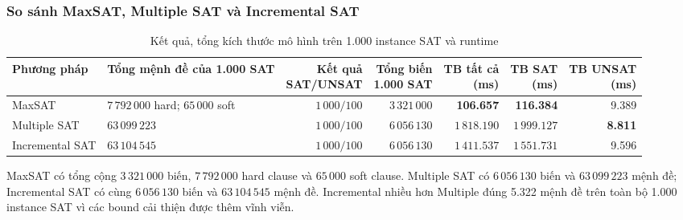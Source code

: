 \documentclass[a4paper,fleqn]{cas-sc}
\begin{document}
\subsubsection{So sánh MaxSAT, Multiple SAT và Incremental SAT}

\begin{table}[htbp]
\centering
\caption{Kết quả, tổng kích thước mô hình trên 1.000 instance SAT và runtime}
\label{tab:method-results}
\scriptsize
\begin{tabularx}{\linewidth}{@{}lXrrrrr@{}}
\toprule
Phương pháp & Tổng mệnh đề của 1.000 SAT & \shortstack{Kết quả\\SAT/UNSAT} & \shortstack{Tổng biến\\1.000 SAT} & \shortstack{TB tất cả\\(ms)} & \shortstack{TB SAT\\(ms)} & \shortstack{TB UNSAT\\(ms)}\\
\midrule
MaxSAT & $7\,792\,000$ hard; $65\,000$ soft & $1\,000/100$ & $3\,321\,000$ & \textbf{106.657} & \textbf{116.384} & 9.389\\
Multiple SAT & $63\,099\,223$ & $1\,000/100$ & $6\,056\,130$ & $1\,818.190$ & $1\,999.127$ & \textbf{8.811}\\
Incremental SAT & $63\,104\,545$ & $1\,000/100$ & $6\,056\,130$ & $1\,411.537$ & $1\,551.731$ & 9.596\\
\bottomrule
\end{tabularx}
\end{table}

 MaxSAT có tổng cộng $3\,321\,000$ biến, $7\,792\,000$ hard clause và $65\,000$ soft clause. Multiple SAT có $6\,056\,130$ biến và $63\,099\,223$ mệnh đề; Incremental SAT có cùng $6\,056\,130$ biến và $63\,104\,545$ mệnh đề. Incremental nhiều hơn Multiple đúng 5.322 mệnh đề trên toàn bộ 1.000 instance SAT vì các bound cải thiện được thêm vĩnh viễn. 
\end{document}
